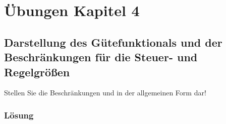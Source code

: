 \section*{Übungen Kapitel 4}
\label{sec:uebung_kapitel_4}

\subsection*{Darstellung des Gütefunktionals und der Beschränkungen für die Steuer- und Regelgrößen}
\label{sec:uebung_darstellung_guetefunktional} 
Stellen Sie die Beschränkungen  und  in der allgemeinen Form  dar!

\subsubsection{Lösung}